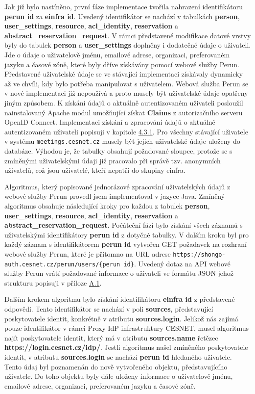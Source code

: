\documentclass[
  printed, %
  twoside, %
  table,   %
  nolof,     %
  nolot,     %
]{fithesis3}
\begin{document}
Jak již bylo nastíněno, první fáze implementace tvořila nahrazení identifikátoru \textbf{perun id} za \textbf{einfra id}. Uvedený identifikátor se nachází v tabulkách \textbf{person}, \textbf{user\_settings}, \textbf{resource}, \textbf{acl\_identity}, \textbf{reservation} a \textbf{abstract\_reservation\_request}. V rámci představené modifikace datové vrstvy byly do tabulek \textbf{person} a \textbf{user\_settings} doplněny i dodatečné údaje o uživateli. Jde o údaje o uživatelově jménu, emailové adrese, organizaci, preferovaném jazyku a časové zóně, které byly dříve získávány pomocí webové služby Perun. Představené uživatelské údaje se ve stávající implementaci získávaly dynamicky až ve chvíli, kdy bylo potřeba manipulovat s uživatelem. Webová služba Perun se v nové implementaci již nepoužívá a proto musely být uživatelské údaje opatřeny jiným způsobem. K získání údajů o aktuálně autentizovaném uživateli posloužil nainstalovaný Apache modul umožňující získat \textbf{Claims} z autorizačního serveru OpenID Connect. Implementaci získání a zpracování údajů o aktuálně autentizovaném uživateli popisuji v kapitole \hyperref[ShongoImpl-authn]{4.3.1}. Pro všechny stávající uživatele v systému \texttt{meetings.cesnet.cz} musely být jejich uživatelské údaje uloženy do databáze. Výhodou je, že tabulky obsahují požadované sloupce, protože se s zmíněnými uživatelskými údaji již pracovalo při správě tzv. anonymních uživatelů, což jsou uživatelé, kteří nepatří do skupiny einfra. 
\par

Algoritmus, který popisované jednorázové zpracování uživatelských údajů z webové služby Perun provedl jsem implementoval v jazyce Java. Zmíněný algoritmus obsahuje následující kroky pro každou z tabulek \textbf{person}, \textbf{user\_settings}, \textbf{resource}, \textbf{acl\_identity}, \textbf{reservation} a \textbf{abstract\_reservation\_request}. Počáteční fází bylo získání všech záznamů s uživatelskými identifikátory \textbf{perun id} z dotyčné tabulky. V dalším kroku byl pro každý záznam s identifikátorem \textbf{perun id} vytvořen GET požadavek na rozhraní webové služby Perun, které je přítomno na URL adrese \texttt{https://shongo-auth.cesnet.cz/perun/users/\{perun id\}}. Uvedený dotaz na API webové služby Perun vrátí požadované informace o uživateli ve formátu JSON jehož strukturu popisuji v příloze \hyperref[table:perunws:user]{A.1}.

\par

Dalším krokem algoritmu bylo získání identifikátoru \textbf{einfra id} z představené odpovědi. Tento identifikátor se nachází v poli \textbf{sources}, představující poskytovatele identit, konkrétně v atributu \textbf{sources.login}. Jelikož nás zajímá pouze identifikátor v rámci Proxy IdP infrastruktury CESNET, musel algoritmus najít poskytovatele identit, který má v atributu \textbf{sources.name} řetězec \textbf{https://login.cesnet.cz/idp/}. Jestli algoritmus našel zmíněného poskytovatele identit, v atributu \textbf{sources.login} se nachází \textbf{perun id} hledaného uživatele. Tento údaj byl poznamenán do nově vytvořeného objektu, představujícího uživatele. Do toho objektu byly dále uloženy informace o uživatelově jménu, emailové adrese, organizaci, preferovaném jazyku a časové zóně. 
\end{document}
